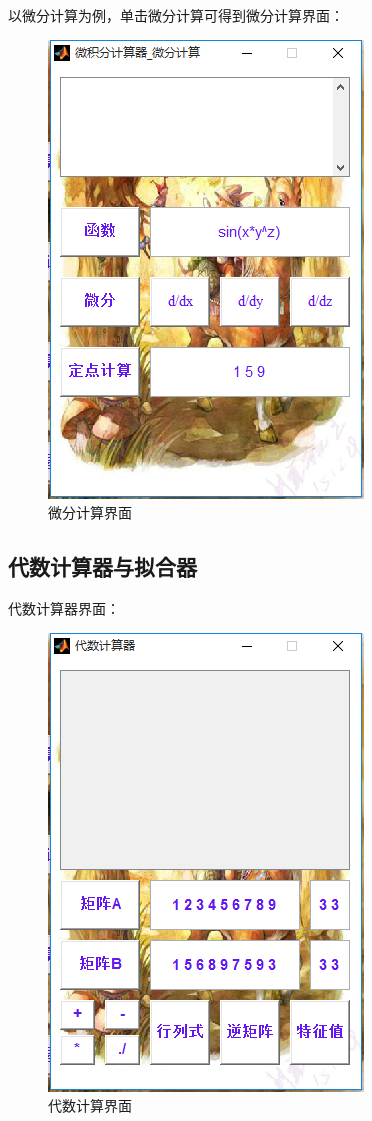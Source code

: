\documentclass[UTF8]{ctexart}
\begin{document}
以微分计算为例，单击微分计算可得到微分计算界面：
\begin{figure}[H]
\centering
\includegraphics[scale=0.45]{image/pic05.png}
\caption{微分计算界面}
\label{fig:pic05}
\end{figure}

\subsection{代数计算器与拟合器}
代数计算器界面：
\begin{figure}[H]
\centering
\includegraphics[scale=0.45]{image/pic06.png}
\caption{代数计算界面}
\label{fig:pic06}
\end{figure}
\end{document}
